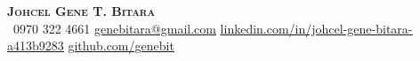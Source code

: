 \begin{center}
    \textbf{\Huge \scshape Johcel Gene T. Bitara} \\ \vspace{1pt}
     \ \small 0970 322 4661 \quad
    \href{mailto:genebitara@gmail.com}{ \underline{genebitara@gmail.com}} \quad
    \href{https://www.linkedin.com/in/johcel-gene-bitara-a413b9283}{ \underline{linkedin.com/in/johcel-gene-bitara-a413b9283}} \quad
    \href{https://github.com/genebit}{ \underline{github.com/genebit}}
\end{center}